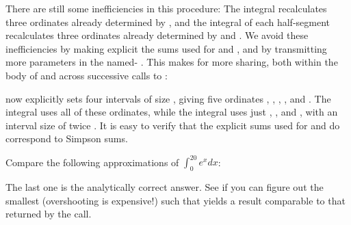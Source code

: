 There are still some inefficiencies in this
procedure: The integral  recalculates three
ordinates already determined by , and the integral
of each half-segment recalculates three ordinates 
already determined by  and .  We avoid
these inefficiencies by making explicit the sums used
for  and , and by transmitting more parameters
in the named- .  This makes for
more sharing, both within the body of 
and across successive calls to :


\n {} now explicitly sets four
intervals of size , giving five ordinates ,
, , , and .  The integral
 uses all of these ordinates, while the integral
 uses just , , and , with an
interval size of twice .  It is easy to verify that
the explicit sums used for  and  do correspond
to Simpson sums.
 
Compare the following approximations of
$\int_0^{20} e^x dx$:


\n The last one is the analytically correct answer.  See
if you can figure out the smallest  (overshooting is
expensive!)
such that  yields a result
comparable to that returned by the 
call.


